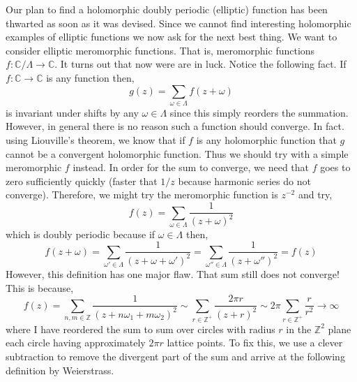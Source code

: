 \documentclass{article}
\newcommand{\Z}{\mathbb{Z}}
\newcommand{\C}{\mathbb{C}}
\theoremstyle{definition}
\begin{document}
Our plan to find a holomorphic doubly periodic (elliptic) function has been thwarted as soon as it
was devised. Since we cannot find interesting holomorphic examples of elliptic functions we now ask
for the next best thing. We want to consider elliptic meromorphic functions. That is, meromorphic
functions $f : \C/\Lambda \to \C$. It turns out that now were are in luck. Notice the following fact. If
$f : \C \to \C$ is any function then,
\[ g(z) = \sum_{\omega \in \Lambda} f(z + \omega) \]
is invariant under shifts by any $\omega \in \Lambda$ since this simply reorders the summation. However, in general there is no reason such a function should converge. In fact. using Liouville’s theorem, we know that if $f$ is any holomorphic function that $g$ cannot be a convergent holomorphic function. Thus we
should try with a simple meromorphic $f$ instead. In order for the sum to converge, we need that $f$
goes to zero sufficiently quickly (faster that $1/z$ because harmonic series do not converge). Therefore,
we might try the meromorphic function is $z^{-2}$ and try,
\[ f(z) = \sum_{\omega \in \Lambda} \frac{1}{(z + \omega)^2} \]
which is doubly periodic because if $\omega \in \Lambda$ then,
\[ f(z + \omega) = \sum_{\omega' \in \Lambda} \frac{1}{(z + \omega + \omega')^2} = \sum_{\omega'' \in \Lambda} \frac{1}{(z + \omega'')^2} = f(z) \]
However, this definition has one major flaw. That sum still does not converge! This is because,
\[ f(z) = \sum_{n,m \in \Z} \frac{1}{(z + n \omega_1 + m \omega_2)^2} \sim \sum_{r \in \Z^{+}} \frac{2 \pi r}{(z + r)^2} \sim 2 \pi \sum_{r \in \Z^{+}} \frac{r}{r^2} \to \infty \]
where I have reordered the sum to sum over circles with radius $r$ in the $\Z^2$ plane each circle having approximately $2 \pi r$ lattice points. To fix this, we use a clever subtraction to remove the divergent part of the sum and arrive at the following definition by Weierstrass.
\end{document}
